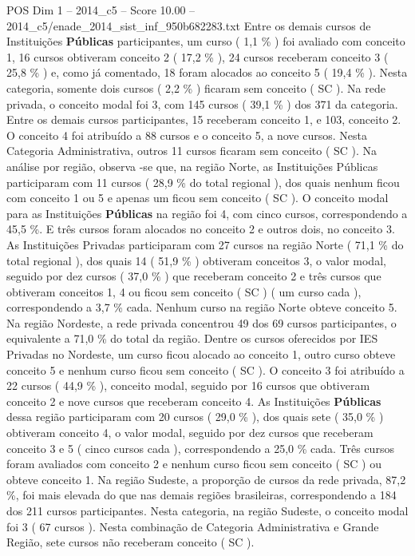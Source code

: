 \begin{textsample}{POS Dim 1 – 2014\_c5 – Score 10.00 – 2014\_c5/enade\_2014\_sist\_inf\_950b682283.txt}
Entre os demais cursos de Instituições \textbf{Públicas} participantes, um curso ( 1,1 \% ) foi avaliado com conceito 1, 16 cursos obtiveram conceito 2 ( 17,2 \% ), 24 cursos receberam conceito 3 ( 25,8 \% ) e, como já comentado, 18 foram alocados ao conceito 5 ( 19,4 \% ).
Nesta categoria, somente dois cursos ( 2,2 \% ) ficaram sem conceito ( SC ).
Na rede privada, o conceito modal foi 3, com 145 cursos ( 39,1 \% ) dos 371 da categoria.
Entre os demais cursos participantes, 15 receberam conceito 1, e 103, conceito 2.
O conceito 4 foi atribuído a 88 cursos e o conceito 5, a nove cursos.
Nesta Categoria Administrativa, outros 11 cursos ficaram sem conceito ( SC ).
Na análise por região, observa -se que, na região Norte, as Instituições Públicas participaram com 11 cursos ( 28,9 \% do total regional ), dos quais nenhum ficou com conceito 1 ou 5 e apenas um ficou sem conceito ( SC ).
O conceito modal para as Instituições \textbf{Públicas} na região foi 4, com cinco cursos, correspondendo a 45,5 \%.
E três cursos foram alocados no conceito 2 e outros dois, no conceito 3.
As Instituições Privadas participaram com 27 cursos na região Norte ( 71,1 \% do total regional ), dos quais 14 ( 51,9 \% ) obtiveram conceitos 3, o valor modal, seguido por dez cursos ( 37,0 \% ) que receberam conceito 2 e três cursos que obtiveram conceitos 1, 4 ou ficou sem conceito ( SC ) ( um curso cada ), correspondendo a 3,7 \% cada.
Nenhum curso na região Norte obteve conceito 5.
Na região Nordeste, a rede privada concentrou 49 dos 69 cursos participantes, o equivalente a 71,0 \% do total da região.
Dentre os cursos oferecidos por IES Privadas no Nordeste, um curso ficou alocado ao conceito 1, outro curso obteve conceito 5 e nenhum curso ficou sem conceito ( SC ).
O conceito 3 foi atribuído a 22 cursos ( 44,9 \% ), conceito modal, seguido por 16 cursos que obtiveram conceito 2 e nove cursos que receberam conceito 4.
As Instituições \textbf{Públicas} dessa região participaram com 20 cursos ( 29,0 \% ), dos quais sete ( 35,0 \% ) obtiveram conceito 4, o valor modal, seguido por dez cursos que receberam conceito 3 e 5 ( cinco cursos cada ), correspondendo a 25,0 \% cada.
Três cursos foram avaliados com conceito 2 e nenhum curso ficou sem conceito ( SC ) ou obteve conceito 1.
Na região Sudeste, a proporção de cursos da rede privada, 87,2 \%, foi mais elevada do que nas demais regiões brasileiras, correspondendo a 184 dos 211 cursos participantes.
Nesta categoria, na região Sudeste, o conceito modal foi 3 ( 67 cursos ).
Nesta combinação de Categoria Administrativa e Grande Região, sete cursos não receberam conceito ( SC ).

\end{textsample}
